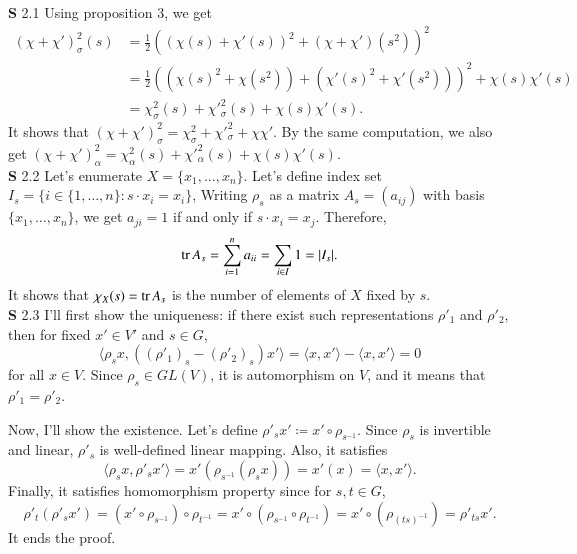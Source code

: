 \documentclass[a4paper, 12pt]{article}
\theoremstyle{Mydefinition}
\theoremstyle{Mytheorem}
\begin{document}
\noindent \textbf{S} 2.1
Using proposition 3, we get
\begin{equation}
\begin{split}
    (\chi+\chi')^2_\sigma(s) &= \frac{1}{2}\left((\chi(s)+\chi'(s))^2 + (\chi+\chi')(s^2)\right)^2 \\
    &= \frac{1}{2}\left((\chi(s)^2 + \chi(s^2)) + (\chi'(s)^2 + \chi'(s^2))\right)^2 + \chi(s)\chi'(s) \\
    &= \chi^2_\sigma(s) + \chi'^2_\sigma(s) + \chi(s)\chi'(s).
\end{split}
\end{equation}
It shows that $(\chi+\chi')^2_\sigma = \chi^2_\sigma + \chi'^2_\sigma + \chi\chi'$. By the same computation, we also get $(\chi+\chi')^2_\alpha = \chi^2_\alpha(s) + \chi'^2_\alpha(s) + \chi(s)\chi'(s)$.\\

\noindent \textbf{S} 2.2
Let's enumerate $X=\{x_1, \ldots, x_n\}$. Let's define index set $I_s = \{i\in \{1, \ldots, n\}:s\cdot x_i = x_i\}$, Writing $\rho_s$ as a matrix $A_s = (a_{ij})$ with basis $\{x_1, \ldots, x_n\}$, we get $a_{ji} = 1$ if and only if $s\cdot x_i = x_j$. Therefore,
\begin{equation}
    \tr A_s = \sum_{i=1}^n a_{ii} = \sum_{i\in I} 1 = \abs{I_s}. 
\end{equation}
It shows that $\chi_{X}(s) = \tr A_s$ is the number of elements of $X$ fixed by $s$.\\

\noindent \textbf{S} 2.3
I'll first show the uniqueness: if there exist such representations $\rho'_1$ and $\rho'_2$, then for fixed $x'\in V'$ and $s\in G$,
\begin{equation}
    \langle \rho_s x, \left((\rho'_1)_s-(\rho'_2)_s\right)x'\rangle = \langle x,x'\rangle - \langle x,x'\rangle = 0
\end{equation}
for all $x\in V$. Since $\rho_s\in GL(V)$, it is automorphism on $V$, and it means that $\rho'_1 = \rho'_2$.

Now, I'll show the existence. Let's define $\rho'_s x' \coloneqq x'\circ \rho_{s^{-1}}$. Since $\rho_s$ is invertible and linear, $\rho'_s$ is well-defined linear mapping. Also, it satisfies
\begin{equation}
    \langle \rho_s x, \rho'_s x'\rangle = x'\left(\rho_{s^{-1}}(\rho_s x)\right) = x'(x) = \langle x, x'\rangle.
\end{equation}
Finally, it satisfies homomorphism property since for $s,t\in G$,
\begin{equation}
    \rho'_t(\rho'_s x') = (x'\circ \rho_{s^{-1}})\circ \rho_{t^{-1}} = x'\circ (\rho_{s^{-1}}\circ \rho_{t^{-1}}) = x'\circ (\rho_{(ts)^{-1}}) = \rho'_{ts}x'.
\end{equation}
It ends the proof.\\
\end{document}

